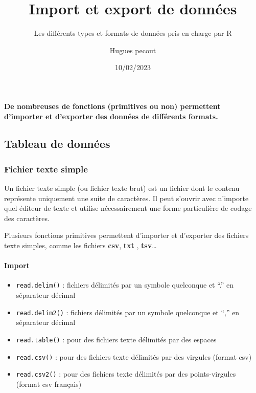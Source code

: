 \documentclass[
  letterpaper,
  DIV=11,
  numbers=noendperiod]{scrartcl}
\title{Import et export de données}
\subtitle{Les différents types et formats de données pris en charge par
R}
\author{Hugues pecout}
\date{10/02/2023}
\let\oldparagraph\paragraph
\renewcommand{\paragraph}[1]{\oldparagraph{#1}\mbox{}}
\providecommand{\tightlist}{%
  \setlength{\itemsep}{0pt}\setlength{\parskip}{0pt}}\usepackage{longtable,booktabs,array}
\renewcommand*\contentsname{Table des matières}
\newcommand\contentsname{Table des matières}
\begin{document}
\maketitle
\ifdefined\Shaded\renewenvironment{Shaded}{\begin{tcolorbox}[sharp corners, frame hidden, boxrule=0pt, interior hidden, breakable, enhanced, borderline west={3pt}{0pt}{shadecolor}]}{\end{tcolorbox}}\fi

\renewcommand*\contentsname{Table des matières}
{
\hypersetup{linkcolor=}
\setcounter{tocdepth}{3}
\tableofcontents
}
\textbf{De nombreuses de fonctions (primitives ou non) permettent
d'importer et d'exporter des données de différents formats.}

\hypertarget{tableau-de-donnuxe9es}{%
\subsection{\texorpdfstring{\textbf{Tableau de
données}}{Tableau de données}}\label{tableau-de-donnuxe9es}}

\hypertarget{fichier-texte-simple}{%
\subsubsection{Fichier texte simple}\label{fichier-texte-simple}}

Un fichier texte simple (ou fichier texte brut) est un fichier dont le
contenu représente uniquement une suite de caractères. Il peut s'ouvrir
avec n'importe quel éditeur de texte et utilise nécessairement une forme
particulière de codage des caractères.

Plusieurs fonctions primitives permettent d'importer et d'exporter des
fichiers texte simples, comme les fichiers \textbf{csv}, \textbf{txt} ,
\textbf{tsv}\ldots{}

\hypertarget{import}{%
\paragraph{Import}\label{import}}

\begin{itemize}
\tightlist
\item
  \texttt{read.delim()} : fichiers délimités par un symbole quelconque
  et ``.'' en séparateur décimal
\item
  \texttt{read.delim2()} : fichiers délimités par un symbole quelconque
  et ``,'' en séparateur décimal
\item
  \texttt{read.table()} : pour des fichiers texte délimités par des
  espaces\\
\item
  \texttt{read.csv()} : pour des fichiers texte délimités par des
  virgules (format csv)
\item
  \texttt{read.csv2()} : pour des fichiers texte délimités par des
  points-virgules (format csv français)
\end{itemize}
\end{document}
